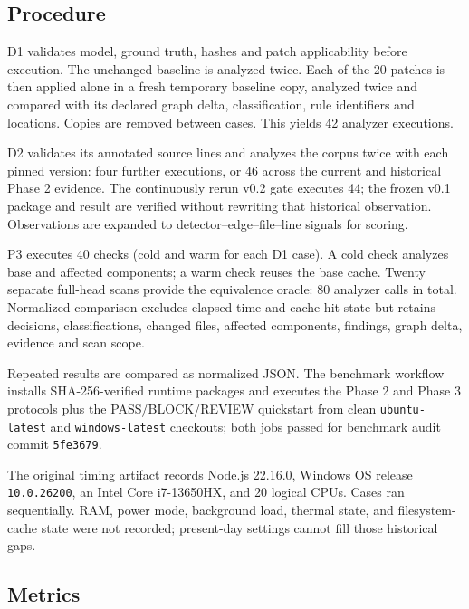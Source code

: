\subsection{Procedure}

D1 validates model, ground truth, hashes and patch applicability before execution. The unchanged baseline is analyzed twice. Each of the 20 patches is then applied alone in a fresh temporary baseline copy, analyzed twice and compared with its declared graph delta, classification, rule identifiers and locations. Copies are removed between cases. This yields 42 analyzer executions.

D2 validates its annotated source lines and analyzes the corpus twice with each pinned version: four further executions, or 46 across the current and historical Phase 2 evidence. The continuously rerun v0.2 gate executes 44; the frozen v0.1 package and result are verified without rewriting that historical observation. Observations are expanded to detector--edge--file--line signals for scoring.

P3 executes 40 checks (cold and warm for each D1 case). A cold check analyzes base and affected components; a warm check reuses the base cache. Twenty separate full-head scans provide the equivalence oracle: 80 analyzer calls in total. Normalized comparison excludes elapsed time and cache-hit state but retains decisions, classifications, changed files, affected components, findings, graph delta, evidence and scan scope.

Repeated results are compared as normalized JSON. The benchmark workflow installs SHA-256-verified runtime packages and executes the Phase 2 and Phase 3 protocols plus the PASS/BLOCK/REVIEW quickstart from clean \texttt{ubuntu-latest} and \texttt{windows-latest} checkouts; both jobs passed for benchmark audit commit \texttt{5fe3679}.

The original timing artifact records Node.js 22.16.0, Windows OS release \texttt{10.0.26200}, an Intel Core i7-13650HX, and 20 logical CPUs. Cases ran sequentially. RAM, power mode, background load, thermal state, and filesystem-cache state were not recorded; present-day settings cannot fill those historical gaps.

\subsection{Metrics}

